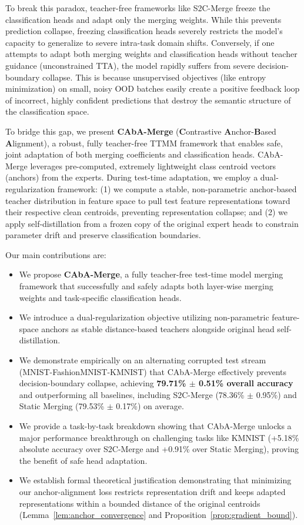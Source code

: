 \documentclass{article}
\theoremstyle{plain}
\theoremstyle{definition}
\theoremstyle{remark}
\begin{document}
To break this paradox, teacher-free frameworks like S2C-Merge \cite{s2c2026merge} freeze the classification heads and adapt only the merging weights. While this prevents prediction collapse, freezing classification heads severely restricts the model's capacity to generalize to severe intra-task domain shifts. Conversely, if one attempts to adapt both merging weights and classification heads without teacher guidance (unconstrained TTA), the model rapidly suffers from severe decision-boundary collapse. This is because unsupervised objectives (like entropy minimization) on small, noisy OOD batches easily create a positive feedback loop of incorrect, highly confident predictions that destroy the semantic structure of the classification space.

To bridge this gap, we present \textbf{CAbA-Merge} (\textbf{C}ontrastive \textbf{A}nchor-\textbf{B}ased \textbf{A}lignment), a robust, fully teacher-free TTMM framework that enables safe, joint adaptation of both merging coefficients and classification heads. CAbA-Merge leverages pre-computed, extremely lightweight class centroid vectors (anchors) from the experts. During test-time adaptation, we employ a dual-regularization framework: (1) we compute a stable, non-parametric anchor-based teacher distribution in feature space to pull test feature representations toward their respective clean centroids, preventing representation collapse; and (2) we apply self-distillation from a frozen copy of the original expert heads to constrain parameter drift and preserve classification boundaries.

Our main contributions are:
\begin{itemize}
    \item We propose \textbf{CAbA-Merge}, a fully teacher-free test-time model merging framework that successfully and safely adapts both layer-wise merging weights and task-specific classification heads.
    \item We introduce a dual-regularization objective utilizing non-parametric feature-space anchors as stable distance-based teachers alongside original head self-distillation.
    \item We demonstrate empirically on an alternating corrupted test stream (MNIST-FashionMNIST-KMNIST) that CAbA-Merge effectively prevents decision-boundary collapse, achieving \textbf{79.71\% $\pm$ 0.51\% overall accuracy} and outperforming all baselines, including S2C-Merge (78.36\% $\pm$ 0.95\%) and Static Merging (79.53\% $\pm$ 0.17\%) on average.
    \item We provide a task-by-task breakdown showing that CAbA-Merge unlocks a major performance breakthrough on challenging tasks like KMNIST (+5.18\% absolute accuracy over S2C-Merge and +0.91\% over Static Merging), proving the benefit of safe head adaptation.
    \item We establish formal theoretical justification demonstrating that minimizing our anchor-alignment loss restricts representation drift and keeps adapted representations within a bounded distance of the original centroids (Lemma~\ref{lem:anchor_convergence} and Proposition~\ref{prop:gradient_bound}).
\end{itemize}
\end{document}
